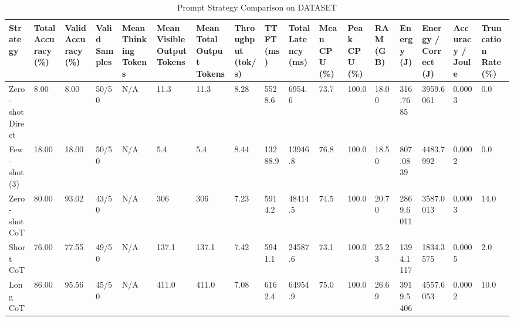 \begin{table}
\caption{Prompt Strategy Comparison on DATASET}
\label{tab:strategy_comparison}
\begin{tabular}{lllllllllllllllll}
\toprule
Strategy & Total Accuracy (\%) & Valid Accuracy (\%) & Valid Samples & Mean Thinking Tokens & Mean Visible Output Tokens & Mean Total Output Tokens & Throughput (tok/s) & TTFT (ms) & Total Latency (ms) & Mean CPU (\%) & Peak CPU (\%) & RAM (GB) & Energy (J) & Energy / Correct (J) & Accuracy / Joule & Truncation Rate (\%) \\
\midrule
Zero-shot Direct & 8.00 & 8.00 & 50/50 & N/A & 11.3 & 11.3 & 8.28 & 5528.6 & 6954.6 & 73.7 & 100.0 & 18.00 & 316.7685 & 3959.6061 & 0.0003 & 0.0 \\
Few-shot (3) & 18.00 & 18.00 & 50/50 & N/A & 5.4 & 5.4 & 8.44 & 13288.9 & 13946.8 & 76.8 & 100.0 & 18.50 & 807.0839 & 4483.7992 & 0.0002 & 0.0 \\
Zero-shot CoT & 80.00 & 93.02 & 43/50 & N/A & 306 & 306 & 7.23 & 5914.2 & 48414.5 & 74.5 & 100.0 & 20.70 & 2869.6011 & 3587.0013 & 0.0003 & 14.0 \\
Short CoT & 76.00 & 77.55 & 49/50 & N/A & 137.1 & 137.1 & 7.42 & 5941.1 & 24587.6 & 73.1 & 100.0 & 25.23 & 1394.1117 & 1834.3575 & 0.0005 & 2.0 \\
Long CoT & 86.00 & 95.56 & 45/50 & N/A & 411.0 & 411.0 & 7.08 & 6162.4 & 64954.9 & 75.0 & 100.0 & 26.69 & 3919.5406 & 4557.6053 & 0.0002 & 10.0 \\
\bottomrule
\end{tabular}
\end{table}
